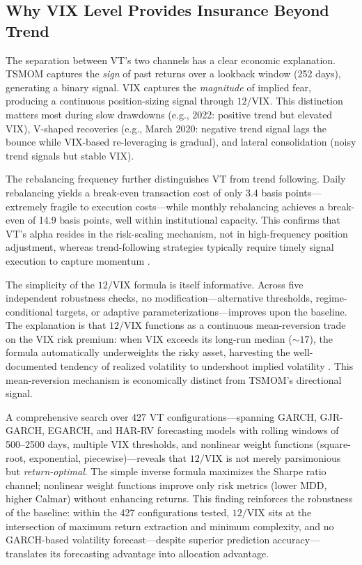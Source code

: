 \documentclass[12pt,a4paper]{article}
\begin{document}
\subsection{Why VIX Level Provides Insurance Beyond Trend}

The separation between VT's two channels has a clear economic explanation. TSMOM captures the \textit{sign} of past returns over a lookback window (252 days), generating a binary signal. VIX captures the \textit{magnitude} of implied fear, producing a continuous position-sizing signal through $12/\text{VIX}$. This distinction matters most during slow drawdowns (e.g., 2022: positive trend but elevated VIX), V-shaped recoveries (e.g., March 2020: negative trend signal lags the bounce while VIX-based re-leveraging is gradual), and lateral consolidation (noisy trend signals but stable VIX).

The rebalancing frequency further distinguishes VT from trend following. Daily rebalancing yields a break-even transaction cost of only 3.4 basis points---extremely fragile to execution costs---while monthly rebalancing achieves a break-even of 14.9 basis points, well within institutional capacity. This confirms that VT's alpha resides in the risk-scaling mechanism, not in high-frequency position adjustment, whereas trend-following strategies typically require timely signal execution to capture momentum \citep{moskowitz2012}.

The simplicity of the $12/\text{VIX}$ formula is itself informative. Across five independent robustness checks, no modification---alternative thresholds, regime-conditional targets, or adaptive parameterizations---improves upon the baseline. The explanation is that $12/\text{VIX}$ functions as a continuous mean-reversion trade on the VIX risk premium: when VIX exceeds its long-run median (${\sim}17$), the formula automatically underweights the risky asset, harvesting the well-documented tendency of realized volatility to undershoot implied volatility \citep{bozovic2024}. This mean-reversion mechanism is economically distinct from TSMOM's directional signal.

A comprehensive search over 427 VT configurations---spanning GARCH, GJR-GARCH, EGARCH, and HAR-RV forecasting models with rolling windows of 500--2500 days, multiple VIX thresholds, and nonlinear weight functions (square-root, exponential, piecewise)---reveals that $12/\text{VIX}$ is not merely parsimonious but \textit{return-optimal}. The simple inverse formula maximizes the Sharpe ratio channel; nonlinear weight functions improve only risk metrics (lower MDD, higher Calmar) without enhancing returns. This finding reinforces the robustness of the baseline: within the 427 configurations tested, $12/\text{VIX}$ sits at the intersection of maximum return extraction and minimum complexity, and no GARCH-based volatility forecast---despite superior prediction accuracy---translates its forecasting advantage into allocation advantage.
\end{document}
